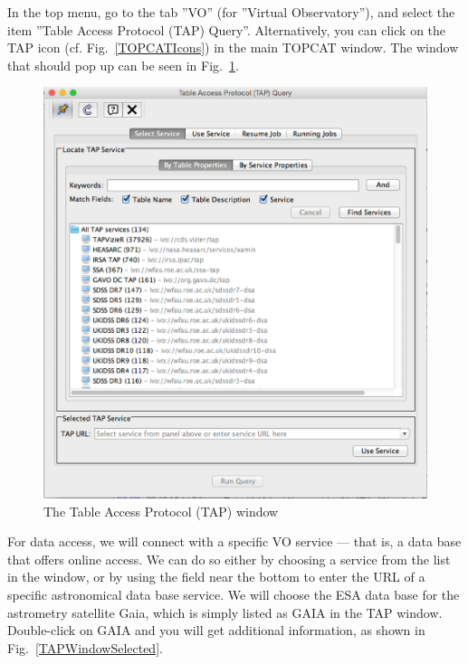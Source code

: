 \documentclass[twocolumn,apj]{openjournal}
\begin{document}
In the top menu, go to the tab ''VO'' (for ''Virtual Observatory''), and select the item ''Table Access Protocol (TAP) Query''. Alternatively, you can click on the TAP icon (cf. Fig.~\ref{TOPCATIcons}) in the main TOPCAT window. The window that should pop up can be seen in Fig.~\ref{TAPWindow}.
\begin{figure}[htbp]
\begin{center}
\includegraphics[width=\linewidth]{tap-window.jpg}
\caption{The Table Access Protocol (TAP) window}
\label{TAPWindow}
\end{center}
\end{figure}
For data access, we will connect with a specific VO service --- that is, a data base that offers online access. We can do so either by choosing a service from the list in the window, or by using the field near the bottom to enter the URL of a specific astronomical data base service.  We will choose the ESA data base for the astrometry satellite Gaia, which is simply listed as GAIA in the TAP window. Double-click on GAIA and you will get additional information, as shown in Fig.~\ref{TAPWindowSelected}.
\end{document}
